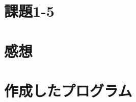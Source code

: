 \documentclass[a4j,11pt]{jarticle}
\begin{document}





\section{課題1-5}


\section{感想}

\section{作成したプログラム}\label{sec:sourcecode}
%
%
{\fontsize{10pt}{11pt} \selectfont
\begin{verbatim}
\end{verbatim}
}

\end{document}
